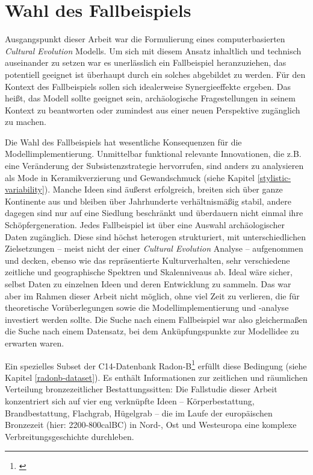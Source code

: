 \documentclass[openany,twoside,twocolumn]{book}
\let\rmarkdownfootnote\footnote%
\def\footnote{\protect\rmarkdownfootnote}
\begin{document}
\hypertarget{case-study}{%
\section{Wahl des Fallbeispiels}\label{case-study}}

Ausgangspunkt dieser Arbeit war die Formulierung eines computerbasierten \emph{Cultural Evolution} Modells. Um sich mit diesem Ansatz inhaltlich und technisch auseinander zu setzen war es unerlässlich ein Fallbeispiel heranzuziehen, das potentiell geeignet ist überhaupt durch ein solches abgebildet zu werden. Für den Kontext des Fallbeispiels sollen sich idealerweise Synergieeffekte ergeben. Das heißt, das Modell sollte geeignet sein, archäologische Fragestellungen in seinem Kontext zu beantworten oder zumindest aus einer neuen Perspektive zugänglich zu machen.

Die Wahl des Fallbeispiels hat wesentliche Konsequenzen für die Modellimplementierung. Unmittelbar funktional relevante Innovationen, die z.B. eine Veränderung der Subsistenzstrategie hervorrufen, sind anders zu analysieren als Mode in Keramikverzierung und Gewandschmuck (siehe Kapitel \ref{stylistic-variability}). Manche Ideen sind äußerst erfolgreich, breiten sich über ganze Kontinente aus und bleiben über Jahrhunderte verhältnismäßig stabil, andere dagegen sind nur auf eine Siedlung beschränkt und überdauern nicht einmal ihre Schöpfergeneration. Jedes Fallbeispiel ist über eine Auswahl archäologischer Daten zugänglich. Diese sind höchst heterogen strukturiert, mit unterschiedlichen Zielsetzungen -- meist nicht der einer \emph{Cultural Evolution} Analyse -- aufgenommen und decken, ebenso wie das repräsentierte Kulturverhalten, sehr verschiedene zeitliche und geographische Spektren und Skalenniveaus ab. Ideal wäre sicher, selbst Daten zu einzelnen Ideen und deren Entwicklung zu sammeln. Das war aber im Rahmen dieser Arbeit nicht möglich, ohne viel Zeit zu verlieren, die für theoretische Vorüberlegungen sowie die Modellimplementierung und -analyse investiert werden sollte. Die Suche nach einem Fallbeispiel war also gleichermaßen die Suche nach einem Datensatz, bei dem Anküpfungspunkte zur Modellidee zu erwarten waren.

Ein spezielles Subset der C14-Datenbank Radon-B\footnote{\textcite{kneisel_radon-b_2013}} erfüllt diese Bedingung (siehe Kapitel \ref{radonb-dataset}). Es enthält Informationen zur zeitlichen und räumlichen Verteilung bronzezeitlicher Bestattungssitten: Die Fallstudie dieser Arbeit konzentriert sich auf vier eng verknüpfte Ideen -- Körperbestattung, Brandbestattung, Flachgrab, Hügelgrab -- die im Laufe der europäischen Bronzezeit (hier: 2200-800calBC) in Nord-, Ost und Westeuropa eine komplexe Verbreitungsgeschichte durchleben.
\end{document}

